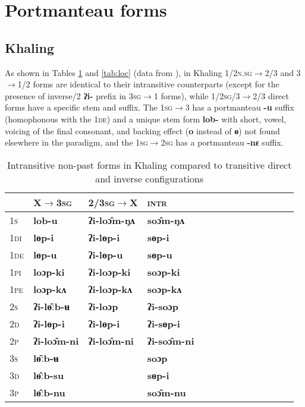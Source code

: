 \documentclass{article}
\newcommand{\ipa}[1]{{\phon\textbf{#1}}}
\newcommand{\grise}[1]{\cellcolor{lightgray}\textbf{#1}}
\newcommand{\bleu}[1]{\cellcolor{blue!30}\textbf{#1}}
\begin{document}
\section{Portmanteau forms}

\subsection{Khaling}
 
As shown in Tables \ref{tab:nonloc} and \ref{tab:loc} (data from \citealt[1102]{jacques12khaling}), in Khaling \textsc{1/2n.sg}$\rightarrow$2/3 and 3$\rightarrow$1/2  forms are identical to their intransitive counterparts (except for the presence of inverse/2 \ipa{ʔi-} prefix in \textsc{3sg}$\rightarrow$1 forms), while \textsc{1/2sg/3}$\rightarrow$2/3 direct forms have a specific stem and suffix. The \textsc{1sg$\rightarrow$3} has a portmanteau \ipa{-u} suffix (homophonous with the \textsc{1de}) and a unique stem form \ipa{lob-} with short, vowel, voicing of the final consonant, and backing effect (\ipa{o} instead of \ipa{ɵ}) not found elsewhere in the paradigm, and the \textsc{1sg$\rightarrow$2sg} has a portmanteau \ipa{-nɛ} suffix.

\begin{table}[H]
\caption{Intransitive non-past forms in Khaling compared to transitive direct and inverse configurations} \label{tab:nonloc} \centering
\begin{tabular}{llllllllllllll}
 \toprule
 &	X$\rightarrow$\textsc{3sg} &	\textsc{2/3sg}$\rightarrow$X &	\textsc{intr} &	\\	
 \midrule
\textsc{1s} &	\ipa{lob-u} \bleu{}&	\ipa{ʔi-loɔ̂m-ŋʌ} &	\ipa{soɔ̂m-ŋʌ} &	\\	
\textsc{1di} &	\ipa{lɵp-i} &	\ipa{ʔi-lɵp-i} &	\ipa{sɵp-i} &	\\	
\textsc{1de} &	\ipa{lɵp-u} &	\ipa{ʔi-lɵp-u} &	\ipa{sɵp-u} &	\\	
\textsc{1pi} &	\ipa{loɔp-ki} &	\ipa{ʔi-loɔp-ki} &	\ipa{soɔp-ki} &	\\	
\textsc{1pe} &	\ipa{loɔp-kʌ} &	\ipa{ʔi-loɔp-kʌ} &	\ipa{soɔp-kʌ} &	\\	
\textsc{2s} &	\ipa{ʔi-lɵ̄ːb-ʉ} \bleu{}&	\ipa{ʔi-loɔp} &	\ipa{ʔi-soɔp} &	\\	
\textsc{2d} &	\ipa{ʔi-lɵp-i} &	\ipa{ʔi-lɵp-i} &	\ipa{ʔi-sɵp-i} &	\\	
\textsc{2p} &	\ipa{ʔi-loɔ̂m-ni} &	\ipa{ʔi-loɔ̂m-ni} &	\ipa{ʔi-soɔ̂m-ni} &	\\	
\textsc{3s} &	\ipa{lɵ̄ːb-ʉ} \bleu{}&	 \grise{} &	\ipa{soɔp} &	\\	
\textsc{3d} &	\ipa{lɵ̂ːb-su} \bleu{}&	\grise{} &	\ipa{sɵp-i} &	\\	
\textsc{3p} &	\ipa{lɵ̂ːb-nu} \bleu{}&	\grise{} &	\ipa{soɔ̂m-nu} &	\\	
\bottomrule
\end{tabular}
\end{table}
\end{document}
